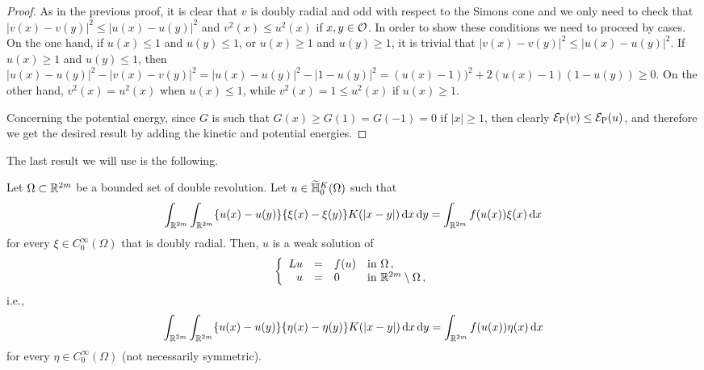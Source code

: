 \begin{proof}
As in the previous proof, it is clear that $v$ is doubly radial and odd with respect to the Simons
cone and we only need to check that $|v(x)-v(y)|^2\leq |u(x)-u(y)|^2$ and $v^2(x) \leq u^2(x)$ if
$x,y\in\mathcal{O}$. In order to show these conditions we need to proceed by cases. On the one hand, if
$u(x)\leq 1$ and $u(y)\leq 1$, or $u(x)\geq 1$ and $u(y)\geq 1$, it is trivial that $|v(x)-v(y)|^2
\leq |u(x)-u(y)|^2$. If $u(x)\geq 1$ and $u(y)\leq 1$, then $ |u(x)-u(y)|^2-|v(x)-v(y)|^2 =
|u(x)-u(y)|^2-|1-u(y)|^2 = (u(x)-1))^2+2(u(x)-1)(1-u(y)) \geq 0$. On the other hand, $v^2(x) =
u^2(x)$ when $u(x)\leq 1$, while $v^2(x) = 1 \leq u^2(x)$ if $u(x)\geq 1$.

Concerning the potential energy, since $G$ is such that $G(x)\geq G(1) = G(-1) = 0$ if $|x|\geq 1$,
then clearly $\mathcal{E}_\mathrm{P}(v) \leq \mathcal{E}_\mathrm{P}(u)$, and therefore we get the desired
result by adding the kinetic and potential energies.
\end{proof}


The last result we will use is the following.

\begin{proposition}
	\label{Prop:WeakSolutionForAllTestFunctions}
	Let $\Omega \subset \mathbb{R}^{2m}$ be a bounded set of double revolution. Let $u\in \widetilde{\mathbb{H}}^K_{0}(\Omega)$ such that
	$$
	\int_{\mathbb{R}^{2m}}\int_{\mathbb{R}^{2m}} \{u(x)-u(y)\}\{\xi(x)-\xi(y)\} K(|x-y|) \,\mathrm{d} x \,\mathrm{d} y = \int_{\mathbb{R}^{2m}} f(u(x)) \xi(x) \,\mathrm{d} x
	$$
	for every $\xi \in C^\infty_0(\Omega)$ that is doubly radial. Then, $u$ is a weak solution of
	$$
	\left\{\begin{array}{rcll}
	Lu &=& f(u) & \text{in } \Omega\,,\\
	u &=& 0 & \text{in } \mathbb{R}^{2m}\setminus \Omega\,,
	\end{array} \right.
	$$
	i.e.,
	$$
	\int_{\mathbb{R}^{2m}}\int_{\mathbb{R}^{2m}} \{u(x)-u(y)\}\{\eta(x)-\eta(y)\} K(|x-y|) \,\mathrm{d} x \,\mathrm{d} y = \int_{\mathbb{R}^{2m}} f(u(x)) \eta(x) \,\mathrm{d} x
	$$
	for every $\eta \in C^\infty_0(\Omega)$ (not necessarily symmetric).
\end{proposition}

